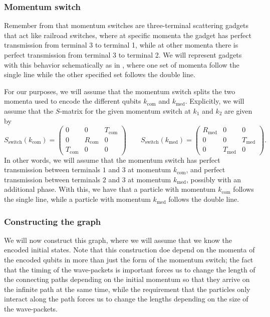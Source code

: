 \documentclass[../thesis-main/thesis-main]{subfiles}
\begin{document}
\subsubsection{Momentum switch}

Remember from  that momentum switches are three-terminal scattering gadgets that act like railroad switches, where at specific momenta the gadget has perfect transmission from terminal 3 to terminal 1, while at other momenta there is perfect transmission from terminal 3 to terminal 2.  We will represent gadgets with this behavior schematically as in , where one set of momenta follow the single line while the other specified set follows the double line.

For our purposes, we will assume that the momentum switch splits the two momenta used to encode the different qubits $k_{\text{com}}$ and $k_{\text{med}}$.  Explicitly, we will assume that the $S$-matrix for the given momentum switch at $k_1$ and $k_2$ are given by
\begin{equation}
  S_{\text{switch}}(k_{\text{com}}) = \begin{pmatrix} 0 & 0 & T_{\text{com}}\\
    0 & R_{\text{com}} & 0\\
    T_{\text{com}} & 0 & 0\end{pmatrix}\qquad
  S_{\text{switch}}(k_{\text{med}}) = \begin{pmatrix}R_{\text{med}} & 0 &0\\
    0 & 0 & T_{\text{med}}\\
    0 & T_{\text{med}} & 0\end{pmatrix}.
\label{eq:switch_S}
\end{equation}
In other words, we will assume that the momentum switch has perfect transmission between terminals $1$ and $3$ at momentum $k_{\text{com}}$, and perfect transmission between terminals $2$ and $3$ at momentum $k_{\text{med}}$, possibly with an additional phase.  With this, we have that a particle with momentum $k_{\text{com}}$ follows the single line, while a particle with momentum $k_{\text{med}}$ follows the double line.


\subsubsection{Constructing the graph}

We will now construct this graph, where we will assume that we know the encoded initial states.  Note that this construction doe depend on the momenta of the encoded qubits in more than just the form of the momentum switch; the fact that the timing of the wave-packets is important forces us to change the length of the connecting paths depending on the initial momentum so that they arrive on the infinite path at the same time, while the requirement that the particles only interact along the path forces us to change the lengths depending on the size of the wave-packets.
\end{document}
